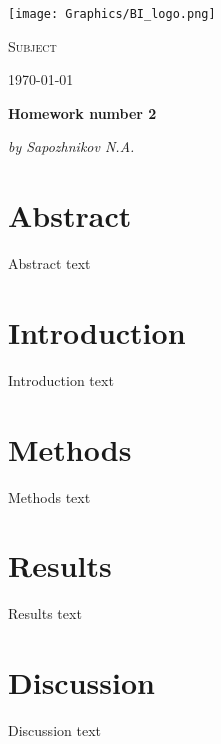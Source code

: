 \documentclass{scrartcl}
\begin{document}
\begin{titlepage}
	\centering
	\texttt{[image: Graphics/BI\_logo.png]}\par
	\vspace{5cm}

	{\scshape\huge Subject \par} 
	\vspace{1cm}
	{\Large \today\par}
	\vfill
	
	{\huge\bfseries Homework number 2\par}
	\vfill
	
	{\Large\itshape by Sapozhnikov N.A.}\par
	\vspace{1.5cm}

	\vfill


	\vfill
\end{titlepage}

\newpage
\section{Abstract}
Abstract text

\section{Introduction}
Introduction text

\section{Methods}
Methods text

\section{Results}
Results text

\section{Discussion}
Discussion text
\end{document}
